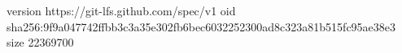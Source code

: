 version https://git-lfs.github.com/spec/v1
oid sha256:9f9a047742ffbb3c3a35e302fb6bec6032252300ad8c323a81b515fc95ae38e3
size 22369700
